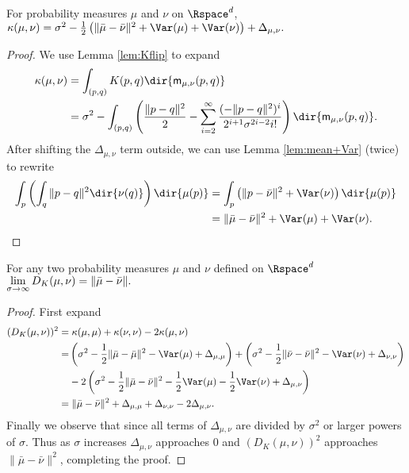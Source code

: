\documentclass[11pt]{myclass}
\begin{document}
\begin{lemma} 
For probability measures $\mu$ and $\nu$ on $\Rspace^d$,  
$
\kappa(\mu,\nu) 
=
\sigma^2 - \frac{1}{2} \left(\|\bar \mu - \bar \nu\|^2 + \Var(\mu) + \Var(\nu) \right) + \Delta_{\mu,\nu}.
$
\label{lem:decomp-kap}
\end{lemma}
\begin{proof}
We use Lemma \ref{lem:Kflip} to expand
\begin{align*}
\kappa(\mu,\nu) 
&= 
\int_{(p,q)} K(p,q) \dir{\textsf{m}_{\mu,\nu}(p,q)}
\\ &=
\sigma^2 - \int_{(p,q)}\left( \frac{\|p-q\|^2}{2} - \sum_{i=2}^\infty \frac{(-\|p-q\|^2)^i}{2^{i+1} \sigma^{2i-2} i!}\right)  \dir{\textsf{m}_{\mu,\nu}(p,q)}.
\end{align*}
After shifting the $\Delta_{\mu,\nu}$ term outside, we can use Lemma \ref{lem:mean+Var} (twice) to rewrite
\begin{align*}
\int_p \left( \int_q \|p-q\|^2 \dir{\nu(q)} \right) \dir{\mu(p)}
&=
\int_p \left(\|p - \bar \nu\|^2 + \Var(\nu)\right) \dir{\mu(p)}
\\ &=
\|\bar \mu - \bar \nu\|^2 + \Var(\mu) + \Var(\nu). \qedhere
\end{align*}
\end{proof}


\begin{theorem}
For any two probability measures $\mu$ and $\nu$ defined on $\Rspace^d$ 
$\begin{displaystyle}
\lim_{\sigma \to \infty} D_K(\mu,\nu) = \|\bar \mu - \bar \nu\|.
\end{displaystyle}$  
\label{thm:DK-means}
\end{theorem}
\begin{proof} 
First expand 
\begin{align*}
(D_K(\mu,\nu))^2 
= & \;
\kappa(\mu,\mu) + \kappa(\nu,\nu) - 2 \kappa(\mu,\nu)
\\ = & 
\left(\sigma^2 - \frac{1}{2} \|\bar \mu - \bar \mu\|^2 - \Var(\mu)  + \Delta_{\mu,\mu} \right)
 + 
\left(\sigma^2 - \frac{1}{2} \|\bar \nu - \bar \nu\|^2 - \Var(\nu)  + \Delta_{\nu,\nu} \right)
 \\ & - 
2\left(\sigma^2 - \frac{1}{2} \|\bar \mu - \bar \nu\|^2 - \frac{1}{2} \Var(\mu) - \frac{1}{2}\Var(\nu)  + \Delta_{\mu,\nu} \right)
\\ =& \;
\|\bar \mu - \bar \nu\|^2 + \Delta_{\mu,\mu} + \Delta_{\nu,\nu} - 2 \Delta_{\mu,\nu}.
\end{align*}
Finally we observe that since all terms of $\Delta_{\mu,\nu}$ are divided by $\sigma^2$ or larger powers of $\sigma$.  Thus as $\sigma$ increases $\Delta_{\mu,\nu}$ approaches $0$ and $(D_K(\mu,\nu))^2$ approaches $\|\bar \mu - \bar \nu\|^2$, completing the proof.  
\end{proof}
\end{document}

